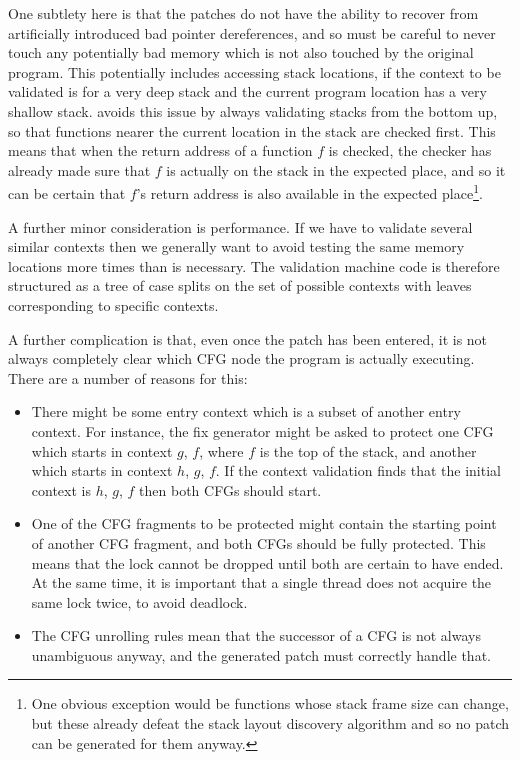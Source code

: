 One subtlety here is that the patches do not have the ability to
recover from artificially introduced bad pointer dereferences, and so
must be careful to never touch any potentially bad memory which is not
also touched by the original program.  This potentially includes
accessing stack locations, if the context to be validated is for a
very deep stack and the current program location has a very shallow
stack.  {\Technique} avoids this issue by always validating stacks
from the bottom up, so that functions nearer the current location in
the stack are checked first.  This means that when the return address
of a function $f$ is checked, the checker has already made sure that
$f$ is actually on the stack in the expected place, and so it can be
certain that $f$'s return address is also available in the expected
place\footnote{One obvious exception would be functions whose stack
  frame size can change, but these already defeat the stack layout
  discovery algorithm and so no patch can be generated for them
  anyway.}.


A further minor consideration is performance.  If we have to validate
several similar contexts then we generally want to avoid testing the
same memory locations more times than is necessary.  The validation
machine code is therefore structured as a tree of case splits on the
set of possible contexts with leaves corresponding to specific
contexts.

A further complication is that, even once the patch has been entered,
it is not always completely clear which CFG node the program is
actually executing.  There are a number of reasons for this:

\begin{itemize}
\item
  There might be some entry context which is a subset of another entry
  context.  For instance, the fix generator might be asked to protect
  one CFG which starts in context $g$, $f$, where $f$ is the top of
  the stack, and another which starts in context $h$, $g$, $f$.  If
  the context validation finds that the initial context is $h$, $g$,
  $f$ then both CFGs should start.
\item
  One of the CFG fragments to be protected might contain the starting
  point of another CFG fragment, and both CFGs should be fully
  protected.  This means that the lock cannot be dropped until both
  are certain to have ended.  At the same time, it is important that a
  single thread does not acquire the same lock twice, to avoid
  deadlock.
\item
  The CFG unrolling rules mean that the successor of a CFG is not
  always unambiguous anyway, and the generated patch must correctly
  handle that.
\end{itemize}

